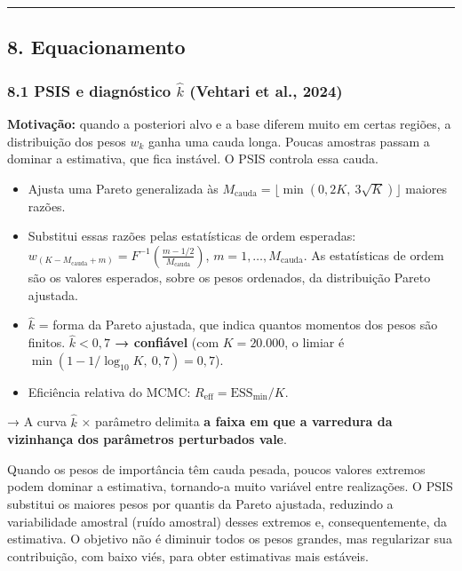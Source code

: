 \documentclass[11pt]{article}
\providecommand{\tightlist}{%
      \setlength{\itemsep}{0pt}\setlength{\parskip}{0pt}}
\begin{document}
\begin{center}\rule{0.5\linewidth}{0.5pt}\end{center}

\subsection{8. Equacionamento}\label{equacionamento}

\subsubsection{\texorpdfstring{8.1 PSIS e diagnóstico \(\hat k\)
(Vehtari et al.,
2024)}{8.1 PSIS e diagnóstico \textbackslash hat k (Vehtari et al., 2024)}}\label{psis-e-diagnuxf3stico-hat-k-vehtari-et-al.-2024}

\textbf{Motivação:} quando a posteriori alvo e a base diferem muito em
certas regiões, a distribuição dos pesos \(w_k\) ganha uma cauda longa.
Poucas amostras passam a dominar a estimativa, que fica instável. O PSIS
controla essa cauda.

\begin{itemize}
\tightlist
\item
  Ajusta uma Pareto generalizada às
  \(M_{\text{cauda}} = \lfloor\min(0{,}2K,\ 3\sqrt K)\rfloor\) maiores
  razões.
\item
  Substitui essas razões pelas estatísticas de ordem esperadas:
  \(w_{(K-M_{\text{cauda}}+m)} = F^{-1}\!\left(\frac{m-1/2}{M_{\text{cauda}}}\right)\),
  \(m=1,\dots,M_{\text{cauda}}\). As estatísticas de ordem são os
  valores esperados, sobre os pesos ordenados, da distribuição Pareto
  ajustada.
\item
  \(\hat k\) = forma da Pareto ajustada, que indica quantos momentos dos
  pesos são finitos. \textbf{\(\hat k < 0{,}7\) → confiável} (com
  \(K = 20.000\), o limiar é
  \(\min(1 - 1/\log_{10}K,\ 0{,}7) = 0{,}7\)).
\item
  Eficiência relativa do MCMC: \(R_{\text{eff}} = \text{ESS}_{\min}/K\).
\end{itemize}

→ A curva \(\hat k\) × parâmetro delimita \textbf{a faixa em que a
varredura da vizinhança dos parâmetros perturbados vale}.

Quando os pesos de importância têm cauda pesada, poucos valores extremos
podem dominar a estimativa, tornando-a muito variável entre realizações.
O PSIS substitui os maiores pesos por quantis da Pareto ajustada,
reduzindo a variabilidade amostral (ruído amostral) desses extremos e,
consequentemente, da estimativa. O objetivo não é diminuir todos os
pesos grandes, mas regularizar sua contribuição, com baixo viés, para
obter estimativas mais estáveis.
\end{document}
